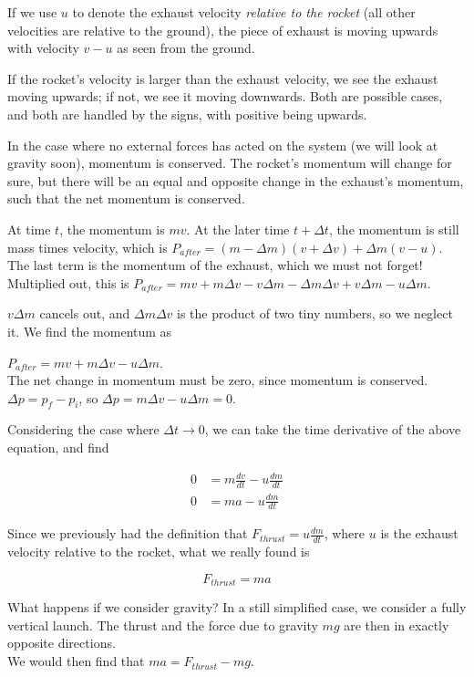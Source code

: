 If we use $u$ to denote the exhaust velocity \emph{relative to the rocket} (all other velocities are relative to the ground), the piece of exhaust is moving upwards with velocity $v - u$ as seen from the ground.

If the rocket's velocity is larger than the exhaust velocity, we see the exhaust moving upwards; if not, we see it moving downwards. Both are possible cases, and both are handled by the signs, with positive being upwards.

In the case where no external forces has acted on the system (we will look at gravity soon), momentum is conserved. The rocket's momentum will change for sure, but there will be an equal and opposite change in the exhaust's momentum, such that the net momentum is conserved.

At time $t$, the momentum is $m v$. At the later time $t + \Delta t$, the momentum is still mass times velocity, which is $P_{after} = (m - \Delta m)(v + \Delta v) + \Delta m(v - u)$. The last term is the momentum of the exhaust, which we must not forget!\\
Multiplied out, this is $P_{after} = m v + m \Delta v - v \Delta m - \Delta m \Delta v + v \Delta m - u \Delta m$. 

$v \Delta m$ cancels out, and $\Delta m \Delta v$ is the product of two tiny numbers, so we neglect it. We find the momentum as

$P_{after} = m v + m \Delta v - u \Delta m$.\\
The net change in momentum must be zero, since momentum is conserved. $\Delta p = p_f - p_i$, so $\Delta p = m \Delta v - u \Delta m = 0$.

Considering the case where $\Delta t \to 0$, we can take the time derivative of the above equation, and find

\begin{align}
0 &= m \frac{dv}{dt} - u \frac{dm}{dt}\\
0 &= m a - u \frac{dm}{dt}
\end{align}

Since we previously had the definition that $\displaystyle F_{thrust} = u \frac{dm}{dt}$, where $u$ is the exhaust velocity relative to the rocket, what we really found is

\begin{equation}
F_{thrust} = m a
\end{equation}

What happens if we consider gravity? In a still simplified case, we consider a fully vertical launch. The thrust and the force due to gravity $m g$ are then in exactly opposite directions.\\
We would then find that $m a = F_{thrust} - m g$.

